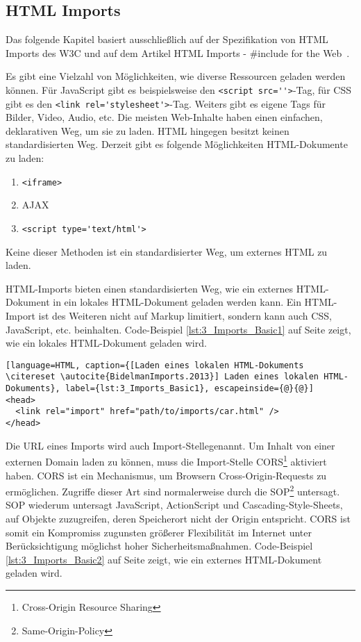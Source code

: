 \subsection{HTML Imports}
\label{sec:3_WC_Imports}

Das folgende Kapitel basiert ausschließlich auf der Spezifikation von HTML Imports des W3C \citereset \autocite[siehe][]{GlazkovMorrita.2013} und auf dem Artikel \glqq HTML Imports - \#include for the Web\grqq\ \citereset \autocite[siehe][]{BidelmanImports.2013}.

Es gibt eine Vielzahl von Möglichkeiten, wie diverse Ressourcen geladen werden können. Für JavaScript gibt es beispielsweise den \lstinline|<script src=''>|-Tag, für CSS gibt es den \lstinline|<link rel='stylesheet'>|-Tag. Weiters gibt es eigene Tags für Bilder, Video, Audio, etc. Die meisten Web-Inhalte haben einen einfachen, deklarativen Weg, um sie zu laden. HTML hingegen besitzt keinen standardisierten Weg. Derzeit gibt es folgende Möglichkeiten HTML-Dokumente zu laden:
\begin{enumerate}
\item \lstinline|<iframe>|
\item AJAX
\item \lstinline|<script type='text/html'>|
\end{enumerate}

Keine dieser Methoden ist ein standardisierter Weg, um externes HTML zu laden.

HTML-Imports bieten einen standardisierten Weg, wie ein externes HTML-Dokument in ein lokales HTML-Dokument geladen werden kann. Ein HTML-Import ist des Weiteren nicht auf Markup limitiert, sondern kann auch CSS, JavaScript, etc. beinhalten. Code-Beispiel \ref{lst:3_Imports_Basic1} auf Seite \pageref{lst:3_Imports_Basic1} zeigt, wie ein lokales HTML-Dokument geladen wird.

\begin{lstlisting}[language=HTML, caption={[Laden eines lokalen HTML-Dokuments \citereset \autocite{BidelmanImports.2013}] Laden eines lokalen HTML-Dokuments}, label={lst:3_Imports_Basic1}, escapeinside={@}{@}]
<head>
  <link rel="import" href="path/to/imports/car.html" />
</head>
\end{lstlisting}

Die URL eines Imports wird auch \glqq Import-Stelle\grqq genannt. Um Inhalt von einer externen Domain laden zu können, muss die Import-Stelle CORS\footnote{Cross-Origin Resource Sharing} aktiviert haben. CORS ist ein Mechanismus, um Browsern Cross-Origin-Requests zu ermöglichen. Zugriffe dieser Art sind normalerweise durch die SOP\footnote{Same-Origin-Policy} untersagt. SOP wiederum untersagt JavaScript, ActionScript und Cascading-Style-Sheets, auf Objekte zuzugreifen, deren Speicherort nicht der Origin entspricht. CORS ist somit ein Kompromiss zugunsten größerer Flexibilität im Internet unter Berücksichtigung möglichst hoher Sicherheitsmaßnahmen. Code-Beispiel \ref{lst:3_Imports_Basic2} auf Seite \pageref{lst:3_Imports_Basic2} zeigt, wie ein externes HTML-Dokument geladen wird.

